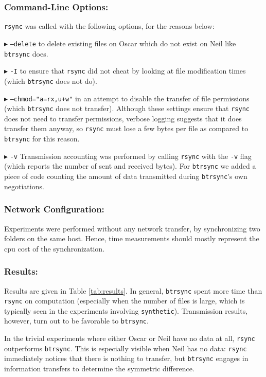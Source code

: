 \documentclass[11pt]{llncs}
\newcommand{\btrsync}{\texttt{btrsync}\xspace}
\newcommand{\rsync}{\texttt{rsync}\xspace}
\begin{document}
\subsubsection{Command-Line Options:} \rsync was called with the following options, for the reasons below:

$\blacktriangleright$ {\tt --delete} to delete existing files on Oscar which do
not exist on Neil like \btrsync does.\smallskip

$\blacktriangleright$ {\tt -I} to ensure that \rsync did not cheat by looking at file modification times (which \btrsync does not do).\smallskip

$\blacktriangleright$ {\tt --chmod="a=rx,u+w"} in an attempt to disable the transfer of file permissions (which \btrsync does not transfer). Although these settings ensure that \rsync does not need to transfer permissions, verbose logging suggests that it does transfer them anyway, so \rsync must lose a few bytes per file as compared to \btrsync for this reason.\smallskip

$\blacktriangleright$ {\tt -v} Transmission accounting was performed by calling \rsync with the {\tt -v} flag (which reports the number of sent and received bytes). For \btrsync we added a piece of code counting the amount of data transmitted during \btrsync's own negotiations.\smallskip

\subsubsection{Network Configuration:} Experiments were performed without any network transfer, by synchronizing two folders on the same host. Hence, time measurements should mostly represent the {\sc cpu} cost of the synchronization.

\subsubsection{Results:}

Results are given in Table \ref{tab:results}. In general, \btrsync spent more time than \rsync on computation (especially when the number of files is large, which is typically seen in the experiments involving {\tt synthetic}). Transmission results, however, turn out to be favorable to \btrsync.\smallskip

In the trivial experiments where either Oscar or Neil have no data at all, \rsync outperforms \btrsync. This is especially visible when Neil has no data: \rsync immediately notices that there is nothing to transfer, but \btrsync engages in information transfers to determine the symmetric
difference.\smallskip
\end{document}
